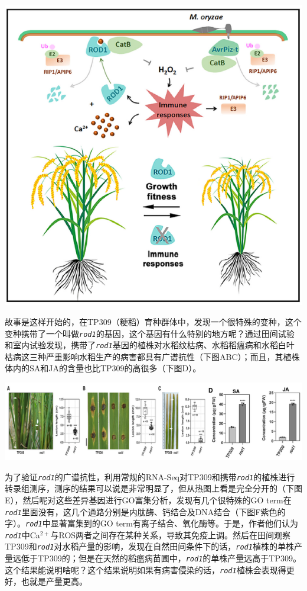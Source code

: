 \documentclass[
  10pt,
]{book}
\begin{document}
\includegraphics{figures/HeZuhuaCell2021/17.png}

故事是这样开始的，在TP309（粳稻）育种群体中，发现一个很特殊的变种，这个变种携带了一个叫做\emph{\texttt{rod1}}的基因，这个基因有什么特别的地方呢？通过田间试验和室内试验发现，携带了\emph{\texttt{rod1}}基因的植株对水稻纹枯病、水稻稻瘟病和水稻白叶枯病这三种严重影响水稻生产的病害都具有广谱抗性（下图ABC）；而且，其植株体内的SA和JA的含量也比TP309的高很多（下图D）。

\includegraphics{figures/HeZuhuaCell2021/1.png}

为了验证\emph{\texttt{rod1}}的广谱抗性，利用常规的RNA-Seq对TP309和携带\emph{\texttt{rod1}}的植株进行转录组测序，测序的结果可以说是非常明显了，但从热图上看是完全分开的（下图E），然后呢对这些差异基因进行GO富集分析，发现有几个很特殊的GO term在\emph{\texttt{rod1}}里面没有，这几个通路分别是内肽酶、钙结合及DNA结合（下图F紫色的字）。\emph{\texttt{rod1}}中显著富集到的GO term有离子结合、氧化酶等。于是，作者他们认为\emph{\texttt{rod1}}中Ca\(^{2+}\)与ROS两者之间存在某种关系，导致其免疫上调。然后在田间观察TP309和\emph{\texttt{rod1}}对水稻产量的影响，发现在自然田间条件下的话，\emph{\texttt{rod1}}植株的单株产量远低于TP309的；但是在天然的稻瘟病苗圃中，\emph{\texttt{rod1}}的单株产量远高于TP309。这个结果能说明啥呢？这个结果说明如果有病害侵染的话，\emph{\texttt{rod1}}植株会表现得更好，也就是产量更高。
\end{document}
